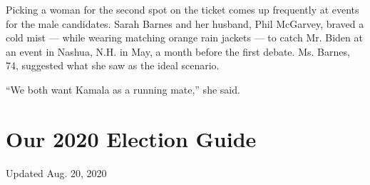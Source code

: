 Picking a woman for the second spot on the ticket comes up frequently at
events for the male candidates. Sarah Barnes and her husband, Phil
McGarvey, braved a cold mist --- while wearing matching orange rain
jackets --- to catch Mr. Biden at an event in Nashua, N.H. in May, a
month before the first debate. Ms. Barnes, 74, suggested what she saw as
the ideal scenario.

``We both want Kamala as a running mate,'' she said.

\hypertarget{our-2020-election-guide}{%
\section{Our 2020 Election Guide}\label{our-2020-election-guide}}

Updated Aug. 20, 2020


